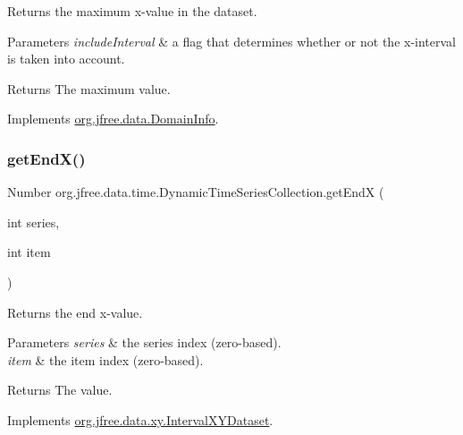 Returns the maximum x-\/value in the dataset.


\begin{DoxyParams}{Parameters}
{\em include\+Interval} & a flag that determines whether or not the x-\/interval is taken into account.\\
\hline
\end{DoxyParams}
\begin{DoxyReturn}{Returns}
The maximum value. 
\end{DoxyReturn}


Implements \mbox{\hyperlink{interfaceorg_1_1jfree_1_1data_1_1_domain_info_a00e455f8db5bd8515266000cacc74e89}{org.\+jfree.\+data.\+Domain\+Info}}.

\mbox{\label{classorg_1_1jfree_1_1data_1_1time_1_1_dynamic_time_series_collection_ab9ced1fc76fea263d7a0ae0072e42f53}} 
\subsubsection{\texorpdfstring{get\+End\+X()}{getEndX()}}
{\footnotesize\ttfamily Number org.\+jfree.\+data.\+time.\+Dynamic\+Time\+Series\+Collection.\+get\+EndX (\begin{DoxyParamCaption}\item[{int}]{series,  }\item[{int}]{item }\end{DoxyParamCaption})}

Returns the end x-\/value.


\begin{DoxyParams}{Parameters}
{\em series} & the series index (zero-\/based). \\
\hline
{\em item} & the item index (zero-\/based).\\
\hline
\end{DoxyParams}
\begin{DoxyReturn}{Returns}
The value. 
\end{DoxyReturn}


Implements \mbox{\hyperlink{interfaceorg_1_1jfree_1_1data_1_1xy_1_1_interval_x_y_dataset_a93161a6d6c1db37cfac030239c62ab0a}{org.\+jfree.\+data.\+xy.\+Interval\+X\+Y\+Dataset}}.

